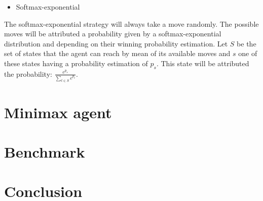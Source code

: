 \documentclass{article}
\newcommand\ddfrac[2]{\frac{\displaystyle #1}{\displaystyle #2}}
\begin{document}
\begin{itemize}
    \item Softmax-exponential
\end{itemize}

The softmax-exponential strategy will always take a move randomly. The possible moves will be attributed a probability given by a softmax-exponential distribution and depending on their winning probability estimation. Let $S$ be the set of states that the agent can reach by mean of its available moves and $s$ one of these states having a probability estimation of $p_{s}$. This state will be attributed the probability: $\ddfrac{e^{p_{s}}}{\sum_{t \in S}{e^{p_{t}}}}$.

\section{Minimax agent}

\section{Benchmark}

\section{Conclusion}
\end{document}
